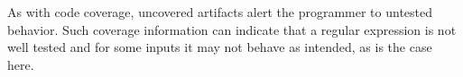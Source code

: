 %
As with code coverage,  uncovered artifacts alert the programmer to untested behavior. Such coverage information can indicate that a regular expression is not well tested and for some inputs it may not behave as intended, as is the case here.

